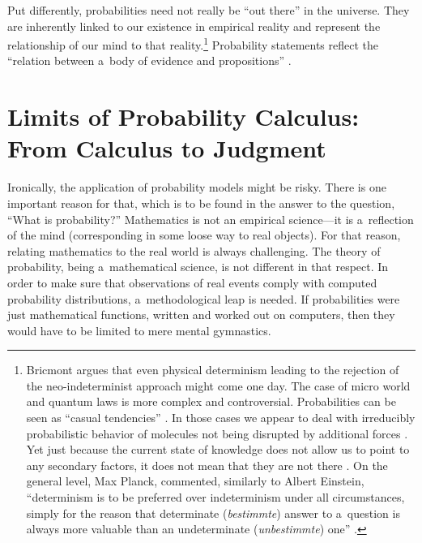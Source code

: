 Put differently, probabilities need not really be ``out there'' in the universe. They are inherently linked to our existence in empirical reality and represent the relationship of our mind to that reality.\footnote{Bricmont 
\parencite*[][]{} %
 argues that even physical determinism leading to the rejection of the neo-indeterminist approach might come one day. The case of micro world and quantum laws is more complex and controversial. Probabilities can be seen as ``casual tendencies'' 
\parencite[][p.295]{shanks_time_1993}. %
 In those cases we appear to deal with irreducibly probabilistic behavior of molecules not being disrupted by additional forces 
\parencite[][p.372]{fetzer_probability_1983}. %
 Yet just because the current state of knowledge does not allow us to point to any secondary factors, it does not mean that they are not there 
\parencite[][p.373]{fetzer_probability_1983}. %
 On the general level, Max Planck, commented, similarly to Albert Einstein, ``determinism is to be preferred over indeterminism under all circumstances, simply for the reason that determinate (\textit{bestimmte}) answer to a~question is always more valuable than an undeterminate (\textit{unbestimmte}) one'' 
\parencite[quoted in][p.281]{kruger_probability_1986}.%
} Probability statements reflect the ``relation between a~body of evidence and propositions'' 
\parencite[][p.232]{moser_foundations_1988}.%




\section{Limits of Probability Calculus: From Calculus to Judgment}

Ironically, the application of probability models might be risky. There is one important reason for that, which is to be found in the answer to the question, ``What is probability?'' Mathematics is not an empirical science---it is a~reflection of the mind (corresponding in some loose way to real objects). For that reason, relating mathematics to the real world is always challenging. The theory of probability, being a~mathematical science, is not different in that respect. In order to make sure that observations of real events comply with computed probability distributions, a~methodological leap is needed. If probabilities were just mathematical functions, written and worked out on computers, then they would have to be limited to mere mental gymnastics.



